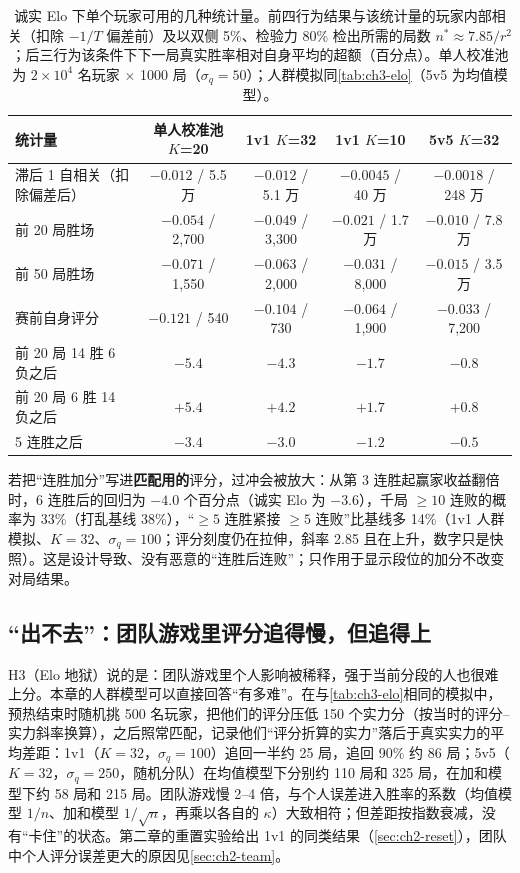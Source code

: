 \begin{table}[htbp]
\centering\small
\caption{诚实 Elo 下单个玩家可用的几种统计量。前四行为结果与该统计量的玩家内部相关（扣除 $-1/T$ 偏差前）及以双侧 5\%、检验力 80\% 检出所需的局数 $n^*\approx7.85/r^2$；后三行为该条件下下一局真实胜率相对自身平均的超额（百分点）。单人校准池为 $2\times10^4$ 名玩家 $\times$ 1000 局（$\sigma_q=50$）；人群模拟同\cref{tab:ch3-elo}（5v5 为均值模型）。\tagOwn}
\label{tab:ch3-detect}
\footnotesize
\setlength{\tabcolsep}{4pt}
\begin{tabular}{lcccc}
\toprule
统计量 & 单人校准池 $K$=20 & 1v1 $K$=32 & 1v1 $K$=10 & 5v5 $K$=32 \\
\midrule
滞后 1 自相关（扣除偏差后） & $-0.012$ / 5.5 万 & $-0.012$ / 5.1 万 & $-0.0045$ / 40 万 & $-0.0018$ / 248 万 \\
前 20 局胜场 & $-0.054$ / 2,700 & $-0.049$ / 3,300 & $-0.021$ / 1.7 万 & $-0.010$ / 7.8 万 \\
前 50 局胜场 & $-0.071$ / 1,550 & $-0.063$ / 2,000 & $-0.031$ / 8,000 & $-0.015$ / 3.5 万 \\
赛前自身评分 & $-0.121$ / 540 & $-0.104$ / 730 & $-0.064$ / 1,900 & $-0.033$ / 7,200 \\
\midrule
前 20 局 14 胜 6 负之后 & $-5.4$ & $-4.3$ & $-1.7$ & $-0.8$ \\
前 20 局 6 胜 14 负之后 & $+5.4$ & $+4.2$ & $+1.7$ & $+0.8$ \\
5 连胜之后 & $-3.4$ & $-3.0$ & $-1.2$ & $-0.5$ \\
\bottomrule
\end{tabular}
\end{table}

若把“连胜加分”写进\textbf{匹配用的}评分，过冲会被放大：从第 3 连胜起赢家收益翻倍时，6 连胜后的回归为 $-4.0$ 个百分点（诚实 Elo 为 $-3.6$），千局 $\ge10$ 连败的概率为 33\%（打乱基线 38\%），“$\ge5$ 连胜紧接 $\ge5$ 连败”比基线多 14\%（1v1 人群模拟、$K=32$、$\sigma_q=100$；评分刻度仍在拉伸，斜率 2.85 且在上升，数字只是快照）\tagOwn{}。这是设计导致、没有恶意的“连胜后连败”；只作用于显示段位的加分不改变对局结果。

\subsection{“出不去”：团队游戏里评分追得慢，但追得上}
\label{sec:ch3-hell}

H3（Elo 地狱）说的是：团队游戏里个人影响被稀释，强于当前分段的人也很难上分。本章的人群模型可以直接回答“有多难”。在与\cref{tab:ch3-elo}相同的模拟中，预热结束时随机挑 500 名玩家，把他们的评分压低 150 个实力分（按当时的评分–实力斜率换算），之后照常匹配，记录他们“评分折算的实力”落后于真实实力的平均差距\tagOwn{}：1v1（$K=32$，$\sigma_q=100$）追回一半约 25 局，追回 90\% 约 86 局；5v5（$K=32$，$\sigma_q=250$，随机分队）在均值模型下分别约 110 局和 325 局，在加和模型下约 58 局和 215 局。团队游戏慢 2–4 倍，与个人误差进入胜率的系数（均值模型 $1/n$、加和模型 $1/\sqrt n$，再乘以各自的 $\kappa$）大致相符；但差距按指数衰减，没有“卡住”的状态。第二章的重置实验给出 1v1 的同类结果（\cref{sec:ch2-reset}），团队中个人评分误差更大的原因见\cref{sec:ch2-team}。

